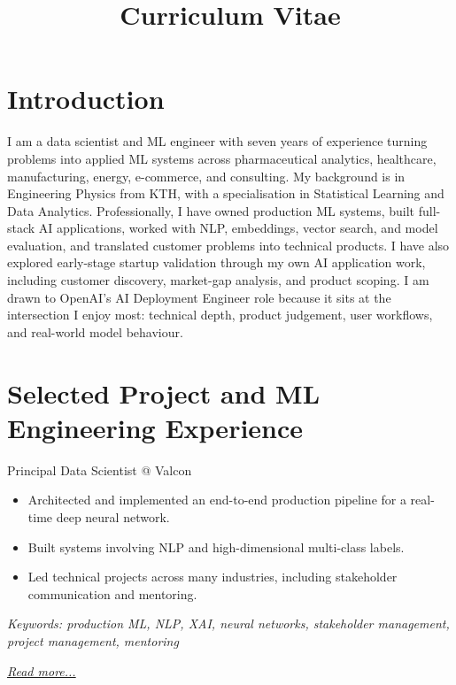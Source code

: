 \documentclass[11pt,a4paper]{moderncv}
\title{Curriculum Vitae}
\begin{document}
\makecvtitle

\section*{Introduction}
I am a data scientist and ML engineer with seven years of experience turning problems into applied ML systems across pharmaceutical analytics, healthcare, manufacturing, energy, e-commerce, and consulting. My background is in Engineering Physics from KTH, with a specialisation in Statistical Learning and Data Analytics.
\newline\hspace*{2em}
Professionally, I have owned production ML systems, built full-stack AI applications, worked with NLP, embeddings, vector search, and model evaluation, and translated customer problems into technical products. I have also explored early-stage startup validation through my own AI application work, including customer discovery, market-gap analysis, and product scoping.
\newline\hspace*{2em}
I am drawn to OpenAI's AI Deployment Engineer role because it sits at the intersection I enjoy most: technical depth, product judgement, user workflows, and real-world model behaviour.

\section{Selected Project and ML Engineering Experience}

\large{Principal Data Scientist @ Valcon}
\normalsize
\begin{itemize}
    \item Architected and implemented an end-to-end production pipeline for a real-time deep neural network.
    \item Built systems involving NLP and high-dimensional multi-class labels.
    \item Led technical projects across many industries, including stakeholder communication and mentoring.
\end{itemize}

{\footnotesize\textit{Keywords: production ML, NLP, XAI, neural networks, stakeholder management, project management, mentoring}}

\hfill{\small{\textit{\hyperref[sec:valcon]{Read more...}}}}
\end{document}
